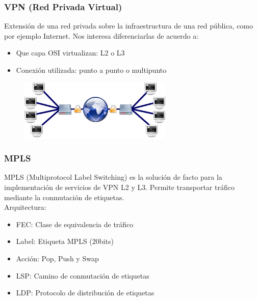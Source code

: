 \documentclass{beamer}
\begin{document}
\begin{frame}
\frametitle{VPN (Red Privada Virtual)} 
Extensión de una red privada sobre la infraestructura de una red pública, como por ejemplo Internet. Nos interesa diferenciarlas de acuerdo a:
\begin{itemize}
\item Que capa OSI virtualizan: L2 o L3
\item Conexi\'on utilizada: punto a punto o multipunto
\end{itemize}
	
\vspace{0.4cm}
\begin{figure}[H]
\centering
\includegraphics[width=0.65\textwidth]{imagenes/vpn.png}
\end{figure}

\end{frame}

\begin{frame}
\frametitle{MPLS} 

MPLS (Multiprotocol Label Switching) es la soluci\'on de facto para la implementaci\'on de servicios de VPN L2 y L3. Permite transportar tr\'afico mediante la conmutaci\'on de etiquetas.\\

\vspace{0.4cm}
\pause
Arquitectura:\\

\begin{itemize}
\item FEC: Clase de equivalencia de tr\'afico
\item Label: Etiqueta MPLS (20bits)
\item Acci\'on: Pop, Push y Swap
\item LSP: Camino de conmutaci\'on de etiquetas
\item LDP: Protocolo de distribución de etiquetas
\end{itemize}

\end{frame}
\end{document}
